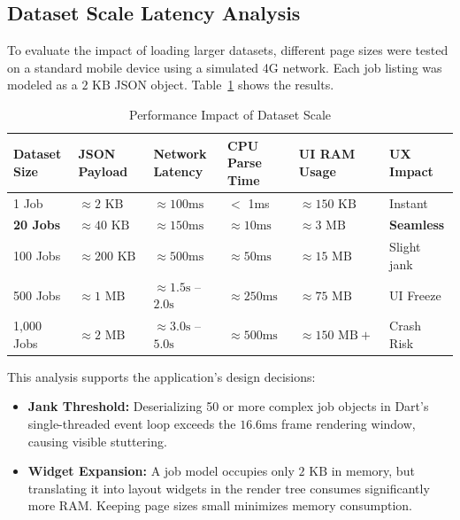 \subsection{Dataset Scale Latency Analysis}
To evaluate the impact of loading larger datasets, different page sizes were tested on a standard mobile device using a simulated 4G network. Each job listing was modeled as a $2\text{ KB}$ JSON object. Table~\ref{tab:dataset_latency} shows the results.

\begin{table}[htbp]
\centering
\caption{Performance Impact of Dataset Scale}
\label{tab:dataset_latency}
\begin{tabular}{|l|l|l|l|l|l|}
\hline
\textbf{Dataset Size} & \textbf{JSON Payload} & \textbf{Network Latency} & \textbf{CPU Parse Time} & \textbf{UI RAM Usage} & \textbf{UX Impact} \\ \hline
1 Job & $\approx 2\text{ KB}$ & $\approx 100\text{ms}$ & $<$ 1ms & $\approx 150\text{ KB}$ & Instant \\ \hline
\textbf{20 Jobs} & \textbf{$\approx 40\text{ KB}$} & \textbf{$\approx 150\text{ms}$} & \textbf{$\approx 10\text{ms}$} & \textbf{$\approx 3\text{ MB}$} & \textbf{Seamless} \\ \hline
100 Jobs & $\approx 200\text{ KB}$ & $\approx 500\text{ms}$ & $\approx 50\text{ms}$ & $\approx 15\text{ MB}$ & Slight jank \\ \hline
500 Jobs & $\approx 1\text{ MB}$ & $\approx 1.5\text{s}$ -- $2.0\text{s}$ & $\approx 250\text{ms}$ & $\approx 75\text{ MB}$ & UI Freeze \\ \hline
1,000 Jobs & $\approx 2\text{ MB}$ & $\approx 3.0\text{s}$ -- $5.0\text{s}$ & $\approx 500\text{ms}$ & $\approx 150\text{ MB}+$ & Crash Risk \\ \hline
\end{tabular}
\end{table}

This analysis supports the application's design decisions:
\begin{itemize}
    \item \textbf{Jank Threshold:} Deserializing 50 or more complex job objects in Dart's single-threaded event loop exceeds the $16.6\text{ms}$ frame rendering window, causing visible stuttering.
    \item \textbf{Widget Expansion:} A job model occupies only $2\text{ KB}$ in memory, but translating it into layout widgets in the render tree consumes significantly more RAM. Keeping page sizes small minimizes memory consumption.
\end{itemize}


